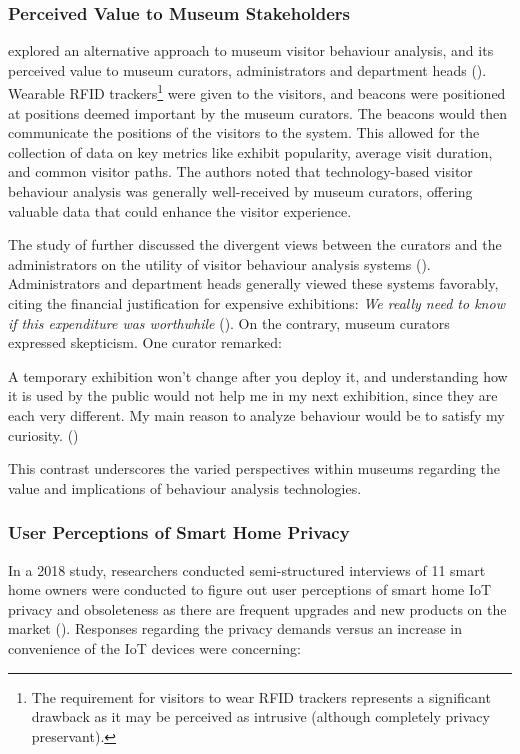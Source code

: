 \subsubsection{Perceived Value to Museum Stakeholders}
\citeauthor{la2017museumbehaviouranalysis} explored an alternative approach to museum visitor behaviour analysis, and its perceived value to museum curators, administrators and department heads (\citeyear{la2017museumbehaviouranalysis}). Wearable RFID trackers\footnote{The requirement for visitors to wear RFID trackers represents a significant drawback as it may be perceived as intrusive (although completely privacy preservant).} were given to the visitors, and beacons were positioned at positions deemed important by the museum curators. The beacons would then communicate the positions of the visitors to the system. This allowed for the collection of data on key metrics like exhibit popularity, average visit duration, and common visitor paths. The authors noted that technology-based visitor behaviour analysis was generally well-received by museum curators, offering valuable data that could enhance the visitor experience.

The study of \citeauthor{la2017museumbehaviouranalysis} further discussed the divergent views between the curators and the administrators on the utility of visitor behaviour analysis systems (\citeyear{la2017museumbehaviouranalysis}). Administrators and department heads generally viewed these systems favorably, citing the financial justification for expensive exhibitions: \textit{We really need to know if this expenditure was worthwhile} (\cite{la2017museumbehaviouranalysis}). On the contrary, museum curators expressed skepticism. One curator remarked: 

\begin{myquote}
    A temporary exhibition won't change after you deploy it, and understanding how it is used by the public would not help me in my next exhibition, since they are each very different. My main reason to analyze behaviour would be to satisfy my curiosity. (\cite{la2017museumbehaviouranalysis})
\end{myquote}

This contrast underscores the varied perspectives within museums regarding the value and implications of behaviour analysis technologies. 

\subsubsection{User Perceptions of Smart Home Privacy}
\label{sec:smarthomeprivacy}
In a 2018 study, researchers conducted semi-structured interviews of 11 smart home owners were conducted to figure out user perceptions of smart home IoT privacy and obsoleteness as there are frequent upgrades and new products on the market (\cite{zh2018userperceptionsofIoTPrivacy}). Responses regarding the privacy demands versus an increase in convenience of the IoT devices were concerning:

